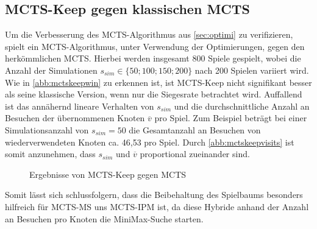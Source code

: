 \documentclass[12pt,a4paper,bibliography=totocnumbered,listof=totocnumbered]{article}
\begin{document}
\subsection{MCTS-Keep gegen klassischen MCTS}
Um die Verbesserung des MCTS-Algorithmus aus \autoref{sec:optimi} zu verifizieren, spielt ein MCTS-Algorithmus, unter Verwendung der Optimierungen, gegen den herkömmlichen MCTS. Hierbei werden insgesamt 800 Spiele gespielt, wobei die Anzahl der Simulationen $s_{sim}\in \{50;100;150;200\}$ nach 200 Spielen variiert wird.\\
Wie in \autoref{abb:mctskeepwin} zu erkennen ist, ist MCTS-Keep nicht signifikant besser als seine klassische Version, wenn nur die Siegesrate betrachtet wird. Auffallend ist das annähernd lineare Verhalten von $s_{sim}$ und die durchschnittliche Anzahl an Besuchen der übernommenen Knoten $\overline{v}$ pro Spiel. Zum Beispiel beträgt bei einer Simulationsanzahl von $s_{sim} = 50$ die Gesamtanzahl an Besuchen von wiederverwendeten Knoten ca. 46,53 pro Spiel. Durch \autoref{abb:mctskeepvisits} ist somit anzunehmen, dass $s_{sim}$ und $\overline{v}$ proportional zueinander sind.

\begin{figure} [h]
\centering
\begin{minipage}{0.4\textwidth}
\centering
{}
\label{abb:mctskeepwin}
\end{minipage}
\qquad
\begin{minipage}{0.4\textwidth}
\centering
{}
\label{abb:mctskeepvisits}
\end{minipage}
\label{abb:mctskeeptotal}
\caption{Ergebnisse von MCTS-Keep gegen MCTS}
\end{figure}
Somit lässt sich schlussfolgern, dass die Beibehaltung des Spielbaums besonders hilfreich für MCTS-MS uns MCTS-IPM ist, da diese Hybride anhand der Anzahl an Besuchen pro Knoten die MiniMax-Suche starten.
\end{document}
